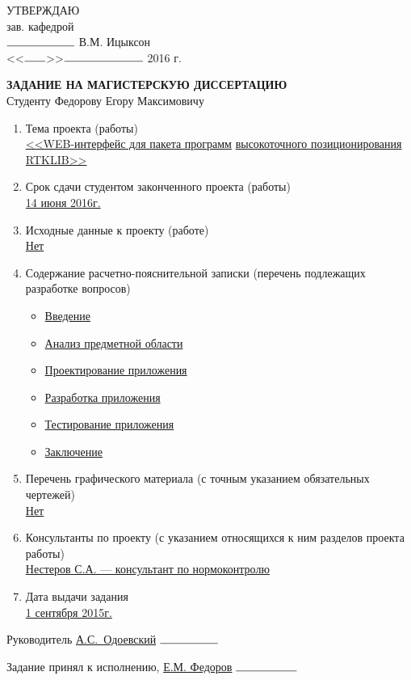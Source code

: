 

\newcommand{\offset}{5.6cm}
\newcommand{\ruleD}{0.15mm}



\hfill\begin{minipage}{\dimexpr\textwidth-\offset}
УТВЕРЖДАЮ \\
зав. кафедрой \\
$\rule{2.1cm}{\ruleD}$ В.М. Ицыксон \\
<<$\rule{0.65cm}{\ruleD}$>>$\rule{2.45cm}{\ruleD}$ 2016 г.\\[1.0cm]
\end{minipage}




\begin{center}
\textbf{ЗАДАНИЕ НА МАГИСТЕРСКУЮ ДИССЕРТАЦИЮ}\\
Студенту Федорову Егору Максимовичу\\
\end{center}


\begin{enumerate}
	\item Тема проекта (работы)\\
		\underline{<<WEB-интерфейс для пакета программ}
		\underline{высокоточного позиционирования RTKLIB>>}
	\item Срок сдачи студентом законченного проекта (работы)\\
		\underline{14 июня 2016г.}
	\item Исходные данные к проекту (работе)\\
		\underline{Нет}
	\item Содержание расчетно-пояснительной записки (перечень подлежащих разработке вопросов)\\
		\begin{itemize}
			\item \underline{Введение}
			\item \underline{Анализ предметной области}
			\item \underline{Проектирование приложения}
			\item \underline{Разработка приложения}
			\item \underline{Тестирование приложения}
			\item \underline{Заключение}
		\end{itemize}
	\item Перечень графического материала (с точным указанием обязательных чертежей)\\
		\underline{Нет}
	\item Консультанты по проекту (с указанием относящихся к ним разделов проекта работы)\\
		\underline{Нестеров С.А. --- консультант по нормоконтролю}
	\item Дата выдачи задания\\
		\underline{1 сентября 2015г.}
\end{enumerate}




Руководитель \underline{А.С.~Одоевский} \hspace{1.9cm} $\rule{1.8cm}{\ruleD}$

Задание принял к исполнению, \underline{Е.М. Федоров} \hspace{0.47cm}$\rule{1.9cm}{\ruleD}$


\thispagestyle{empty}

